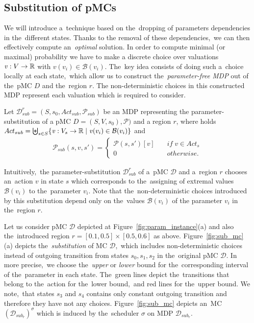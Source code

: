 \subsection{Substitution of pMCs}
We will introduce a~technique based on the~dropping of parameters dependencies in the~different states.
Thanks to the removal of these dependencies,~we can then effectively compute an~\textit{optimal} solution.
In order to compute minimal (or maximal) probability we have to make a discrete choice over valuations $\mathit{v}: V \rightarrow \mathbb{R}$ with $\mathit{v}(v_i) \in \mathcal{B}(v_i)$.
The~key idea consists of doing such a~choice locally at each state,~which allow us to construct the~\textit{parameter-free MDP} out of the~pMC $D$ and the~region $r$.
The non-deterministic choices in this constructed MDP represent each valuation which is required to consider.

\begin{definition}
Let $\mathcal{D}_{sub}^{r} = (S, s_0, Act_{sub}, \mathcal{P}_{sub})$ be an MDP representing the parameter-substitution of a pMC $D = (S, V, s_0), \mathcal{P})$ and a region $r$, where holds $Act_{sub} = \biguplus_{s \in S}\{ \mathit{v}: V_s \rightarrow \mathbb{R} \; \lvert \; \mathit{v}(v_i) \in \mathcal{B}(v_i) \}$ and
\begin{align*}
    \mathcal{P}_{sub}(s, \mathit{v}, s') = 
    \begin{cases}
        \mathcal{P}(s, s')[\mathit{v}] \quad & if \; v \in Act_s \\
        0 \quad & otherwise.
    \end{cases}
\end{align*}
\end{definition}
\noindent
Intuitively,~the parameter-substitution $\mathcal{D}_{sub}^r$ of a~pMC $\mathcal{D}$ and a~region $r$ chooses an~action $\mathit{v}$ in state $s$ which corresponds to the~assigning of extremal values $\mathcal{B}(v_i)$ to the~parameter $v_i$. 
Note that the~non-deterministic choices introduced by this substitution depend only on the~values $\mathcal{B}(v_i)$ of the parameter $v_i$ in the~region $r$.

\begin{example}
Let us consider pMC $\mathcal{D}$ depicted at Figure~\ref{fig:param_instance}(a) and also the~introduced region $r = [0.1, 0.5] \times [0.5, 0.6]$ as above.
Figure~\ref{fig:sub_mc}(a) depicts the~\textit{substitution} of MC $\mathcal{D}$,~which includes non-deterministic choices instead of outgoing transition from states $s_0, s_1, s_2$ in the~original pMC $\mathcal{D}$.
In more precise,~we choose the~\textit{upper} or \textit{lower} bound for the~corresponding interval of the~parameter in each state.
The~green lines depict the~transitions that belong to the~action for the~lower bound,~and red lines for the~upper bound.
We note,~that states $s_3$ and $s_4$ contains only constant outgoing transition and therefore they have not any choices.
Figure~\ref{fig:sub_mc} depicts an~MC $(\mathcal{D}_{sub_r})^\sigma$ which is induced by the~scheduler $\sigma$ on MDP $\mathcal{D}_{sub_r}$.
\end{example}

